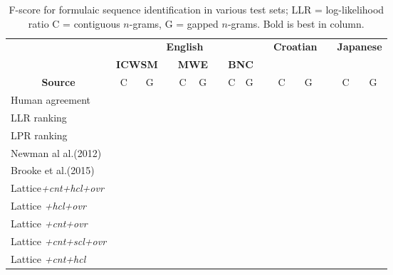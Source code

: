 \documentclass[11pt]{article}
\makeatletter
\def \al {al.\@ }
\makeatother
\begin{document}
 \begin{table}[!bt]
 
 \begin{center}
  \caption{ F-score for formulaic sequence identification in various test sets; LLR = log-likelihood ratio C = contiguous $n$-grams, G = gapped $n$-grams. Bold is best in column.}
 \begin{tabular}{lcccccccccccccc}

       \hline
        \hline
				& \multicolumn{8}{c}{\bf{English}} & & \multicolumn{2}{c}{\bf{Croatian}} & & \multicolumn{2}{c}{\bf{Japanese}} \\
       \cline{2-9}			
       & \multicolumn{2}{c}{\bf{ICWSM}} & &  \multicolumn{2}{c}{\bf{MWE}} & &  \multicolumn{2}{c}{\bf{BNC}} & & &  && & \\
       \cline{2-3} \cline{5-6} \cline{8-9} \cline{11-12} \cline{14-15}
           \multicolumn{1}{c}{\bf{Source}}    & C & G &   & C & G &   & C & G &  & C & G & & C & G  \\
            \hline
           \hline     
           
Human agreement & & & & & & & & & & & & & &\\
 
 \hline
LLR ranking & & & & & & & & & & & & & &\\ 
LPR ranking & & & & & & & & & & & & & &\\ 
Newman al \al (2012)  & & & & & & & & & & & & & &\\ 
Brooke et \al (2015)  & & & & & & & & & & & & & &\\ 
  \hline
	Lattice\emph{+cnt+hcl+ovr} & & & & & & & & & & & & & & \\  

	Lattice \emph{+hcl+ovr} & & & & & & & & & & & & & & \\  	
		Lattice \emph{+cnt+ovr} & & & & & & & & & & & & & & \\  
			Lattice \emph{+cnt+scl+ovr} & & & & & & & & & & & & & & \\  
				Lattice \emph{+cnt+hcl} & & & & & & & & & & & & & & \\  
			
		
            \hline
           \hline                  

 \end{tabular}

 \end{center}
 \end{table}

\end{document}
